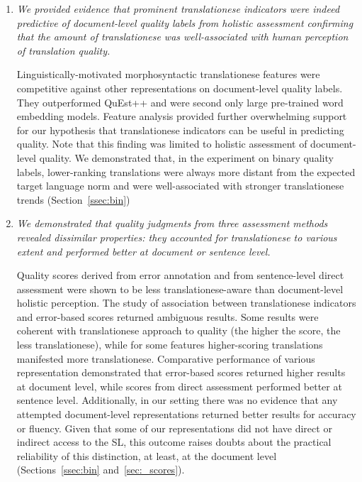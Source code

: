 \begin{enumerate}
	\item \textit{We provided evidence that prominent translationese indicators were indeed predictive of document-level quality labels from holistic assessment confirming that the amount of translationese was well-associated with human perception of translation quality.}   
	
	Linguistically-motivated morphosyntactic translationese features were competitive against other representations on document-level quality labels. They outperformed QuEst++ and were second only large pre-trained word embedding models. Feature analysis provided further overwhelming support for our hypothesis that translationese indicators can be useful in predicting quality. Note that this finding was limited to holistic assessment of document-level quality. We demonstrated that, in the experiment on binary quality labels, lower-ranking translations were always more distant from the expected target language norm and were well-associated with stronger translationese trends (Section~\ref{ssec:bin})
	
	\item \textit{We demonstrated that quality judgments from three assessment methods revealed dissimilar properties: they accounted for translationese to various extent and performed better at document or sentence level.} 
	
	Quality scores derived from error annotation and from sentence-level direct assessment were shown to be less translationese-aware than document-level holistic perception. The study of association between translationese indicators and error-based scores returned ambiguous results. Some results were coherent with translationese approach to quality (the higher the score, the less translationese), while for some features higher-scoring translations manifested more translationese.
	Comparative performance of various representation demonstrated that error-based scores returned higher results at document level, while scores from direct assessment performed better at sentence level. %
	Additionally, in our setting there was no evidence that any attempted document-level representations returned better results for accuracy or fluency. Given that some of our representations did not have direct or indirect access to the SL, this outcome raises doubts about the practical reliability of this distinction, at least, at the document level (Sections~\ref{ssec:bin} and~\ref{sec:_scores}). 
	

\end{enumerate}
